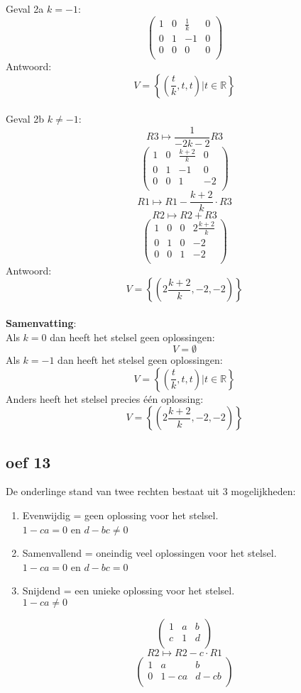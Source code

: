 \documentclass[10pt,a4paper]{article}
\begin{document}
Geval 2a $k=-1$:
\[
\begin{pmatrix}
1 & 0 & \frac{1}{k} & 0\\
0 & 1 & -1 & 0\\
0 & 0 & 0 & 0\\
\end{pmatrix}
\]
Antwoord:
\[
V=\left\lbrace\left(\frac{t}{k},t,t\right) | t \in \mathbb{R}\right\rbrace
\]\\
Geval 2b $k\neq-1$:
\[ R3 \longmapsto \frac{1}{-2k-2}R3\]
\[
\begin{pmatrix}
1 & 0 & \frac{k+2}{k} & 0\\
0 & 1 & -1 & 0\\
0 & 0 & 1 & -2\\
\end{pmatrix}
\]
\[ R1 \longmapsto R1 - \frac{k+2}{k}\cdot R3 \]
\[ R2 \longmapsto R2 + R3 \]
\[
\begin{pmatrix}
1 & 0 & 0 & 2\frac{k+2}{k}\\
0 & 1 & 0 & -2\\
0 & 0 & 1 & -2\\
\end{pmatrix}
\]
Antwoord:
\[
V=\left\lbrace\left(2\frac{k+2}{k},-2,-2\right)\right\rbrace
\]\\
\textbf{Samenvatting}:\\
Als $k=0$ dan heeft het stelsel geen oplossingen:
\[
V=\emptyset
\]
Als $k=-1$ dan heeft het stelsel geen oplossingen:
\[
V=\left\lbrace\left(\frac{t}{k},t,t\right) | t \in \mathbb{R}\right\rbrace
\]
Anders heeft het stelsel precies één oplossing:
\[
V=\left\lbrace\left(2\frac{k+2}{k},-2,-2\right)\right\rbrace
\]

\subsection*{oef 13}
De onderlinge stand van twee rechten bestaat uit 3 mogelijkheden:
\begin{enumerate}
\item Evenwijdig = geen oplossing voor het stelsel.\\
$1-ca = 0$ en $ d -bc \neq 0$
\item Samenvallend = oneindig veel oplossingen voor het stelsel.\\
$1-ca = 0$ en $ d -bc = 0$
\item Snijdend = een unieke oplossing voor het stelsel.\\
$1-ca \neq 0$
\end{enumerate}
\[
\begin{pmatrix}
1 & a & b\\
c & 1 & d\\
\end{pmatrix}
\]
\[ R2 \longmapsto R2 - c \cdot R1\]
\[
\begin{pmatrix}
1 & a & b\\
0 & 1-ca & d-cb\\
\end{pmatrix}
\]
\end{document}
